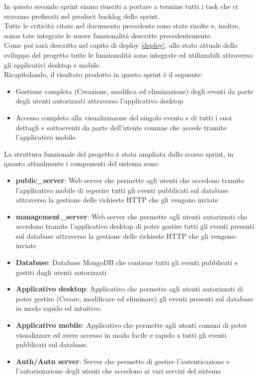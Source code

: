 \documentclass{article}
\begin{document}
In questo secondo sprint siamo riusciti a portare a termine tutti i task che ci eravamo prefissati nel product backlog dello sprint.\\  
Tutte le criticità citate nel documento precedente sono state risolte e, inoltre, sonos tate integrate le nuove funzionalità descritte precedentemente.\\
Come poi sarà descritto nel capito di deploy \ref{deploy}, allo stato attuale dello sviluppo del progetto tutte le funzionalità sono integrate ed utilizzabili attraverso gli applicativi desktop e mobile.\\

\noindent Ricapitolando, il risultato prodotto in questo sprint è il seguente:
\begin{itemize}
    \item Gestione completa (Creazione, modifica ed eliminazione) degli eventi da parte degli utenti autorizzati attraverso l'applicativo desktop
    \item Accesso completo alla visualizzazone del singolo evento e di tutti i suoi dettagli e sottoeventi da parte dell'utente comune che accede tramite l'applicativo mobile
\end{itemize}

\noindent La struttura funzionale del progetto è stata ampliata dallo scorso sprint, in quanto attualmente i componenti del sistema sono:

\begin{itemize}
    \item \textbf{public\_server}: Web server che permette agli utenti che accedono tramite l'applicativo mobile di reperire tutti gli eventi pubblicati sul database attraverso la gestione delle richieste HTTP che gli vengono inviate
    \item \textbf{management\_server}: Web server che permette agli utenti autorizzati che accedono tramite l'applicativo desktop di poter gestire tutti gli eventi presenti sul database attraverso la gestione delle richieste HTTP che gli vengono inviate
    \item \textbf{Database}: Database MongoDB che contiene tutti gli eventi pubblicati e gestiti dagli utenti autorizzati
    \item \textbf{Applicativo desktop}: Applicativo che permette agli utenti autorizzati di poter gestire (Creare, modificare ed eliminare) gli eventi presenti sul database in modo rapido ed intuitivo.
    \item \textbf{Applicativo mobile}: Applicativo che permette agli utenti comuni di poter visualizzare ed avere accesso in modo facile e rapido a tutti gli eventi pubblicati sul database.
    \item \textbf{Auth/Autn server}: Server che permette di gestire l'autenticazione e l'autorizzazione degli utenti che accedono ai vari servizi del sistema
\end{itemize}
\end{document}
